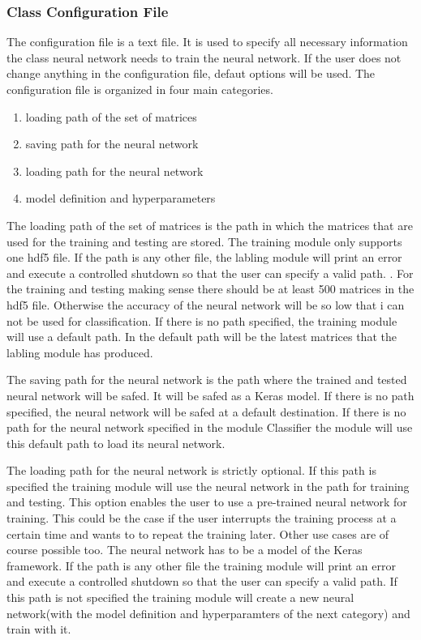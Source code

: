 \documentclass[parskip=full]{scrartcl}
\begin{document}
\subsubsection{Class Configuration File}
The configuration file is a text file.
It is used to specify all necessary information the class neural network needs to train the neural network.
If the user does not change anything in the configuration file, defaut options will be used. The configuration file is organized in four main categories. 
\begin{enumerate}
\item loading path of the set of matrices 
\item saving path for the neural network
\item loading path for the neural network
\item model definition and hyperparameters  
\end{enumerate}
The loading path of the set of matrices is the path in which the matrices that are used for the training and testing are stored.
The training module only supports one hdf5 file.
If the path is any other file, the labling module will print an error and execute a controlled shutdown so that the user can specify a valid path. .
For the training and testing making sense there should be at least 500 matrices in the hdf5 file.
Otherwise the accuracy of the neural network will be so low that i can not be used for classification.
If there is no path specified, the training module will use a default path.
In the default path will be the latest matrices that the labling module has produced. \newline

The saving path for the neural network is the path where the trained and tested neural network will be safed.
It will be safed as a Keras model.
If there is no path specified, the neural network will be safed at a default destination.
If there is no path for the neural network specified in the module Classifier the module will use this default path to load its neural network.\newline

The loading path for the neural network is strictly optional.
If this path is specified the training module will use the neural network in the path for training and testing.
This option enables the user to use a pre-trained neural network for training.
This could be the case if the user interrupts the training process at a certain time and wants to to repeat the training later.
Other use cases are of course possible too.
The neural network has to be a model of the Keras framework. If the path is any other file the training module will print an error and execute a controlled shutdown so that the user can specify a valid path.
If this path is not specified the training module will create a new neural network(with the model definition and hyperparamters of the next category) and train with it. \newline
\end{document}
